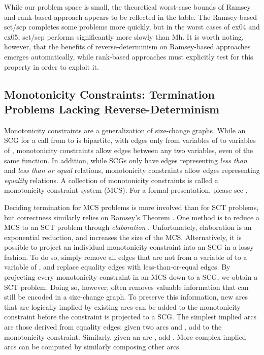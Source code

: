 \documentclass{LMCS}
\begin{document}
While our problem space is small, the theoretical worst-case bounds of
Ramsey and rank-based approach appears to be reflected in the table. The
Ramsey-based sct/scp completes some problems more quickly, but in the worst
cases of ex04 and ex05, sct/scp performs significantly more slowly than Mh. It
is worth noting, however, that the benefits of reverse-determinism on
Ramsey-based approaches emerges automatically, while rank-based approaches must
explicitly test for this property in order to exploit it. 

\subsection{Monotonicity Constraints: Termination Problems Lacking
  Reverse-Deter\-minism}

Monotonicity constraints \cite{CLS05} are a generalization of size-change
graphs. While an SCG for a call from  to  is bipartite, with edges
only from variables of  to variables of , monotonicity constraints allow
edges between any two variables, even of the same function. In addition, while SCGs
only have edges representing \emph{less than} and \emph{less than or equal}
relations, monotonicity constraints allow edges representing \emph{equality}
relations. A collection of monotonicity constraints is called a monotonicity
constraint system (MCS). For a formal presentation, please see \cite{BenAm10}.

Deciding termination for MCS problems is more involved than for SCT problems,
but correctness similarly relies on Ramsey's Theorem \cite{CLS05}. One method
is to reduce a MCS to an SCT problem through {\em elaboration} \cite{BenAm10}. Unfortunately,
elaboration is an exponential reduction, and increases the size of the MCS.
Alternatively, it is possible to project an individual monotonicity constraint into an SCG in a
lossy fashion. To do so, simply remove all edges that are not from a variable of  to a variable
of , and replace equality edges with less-than-or-equal edges. By projecting every monotonicity
constraint in an MCS down to a SCG, we obtain a SCT problem.  Doing so, however, often removes
valuable information that can still be encoded in a size-change graph. To preserve this information,
new arcs that are logically implied by existing arcs can be added to the monotonicity constraint
before the constraint is projected to a SCG.  The simplest implied arcs are those derived from
equality edges: given two arcs  and , add 
to the monotonicity constraint. Similarly, given an arc , add . More complex implied arcs can be computed by similarly composing other arcs.
\end{document}
